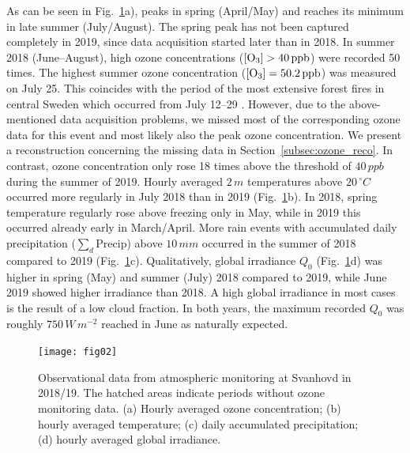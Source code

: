\documentclass[bg, manuscript]{copernicus}
\begin{document}
 As can be seen in Fig.~\ref{fig:data_svanvik_2018_2019}a), \chem{[O_3]} peaks in spring (April/May) and reaches its minimum in late summer (July/August). The spring peak has not been captured completely in 2019, since data acquisition started later than in 2018. In summer 2018 (June--August), high ozone concentrations ($\chem{[O_3]} > 40\,\unit{ppb}$) were recorded 50 times. The highest summer ozone concentration ($\chem{[O_3]} = 50.2\,\unit{ppb}$) was measured on July 25. This coincides with the period of the most extensive forest fires in central Sweden which occurred from July 12--29 \citep{SOU2019}. However, due to the above-mentioned data acquisition problems, we missed most of the corresponding ozone data for this event and most likely also the peak ozone concentration. We present a reconstruction concerning the missing data in Section~\ref{subsec:ozone_reco}. In contrast, ozone concentration only rose 18 times above the threshold of $40\,\unit{ppb}$ during the summer of 2019.
Hourly averaged $2\,\unit{m}$ temperatures above $20\,\unit{^\circ C}$ occurred more regularly in July 2018 than in 2019 (Fig.~\ref{fig:data_svanvik_2018_2019}b). In 2018, spring temperature regularly rose above freezing only in May, while in 2019 this occurred already early in March/April.
More rain events with accumulated daily precipitation ($\sum_d \mathrm{Precip}$) above $10\,\unit{mm}$ occurred in the summer of 2018 compared to 2019 (Fig.~\ref{fig:data_svanvik_2018_2019}c).
Qualitatively, global irradiance $Q_0$ (Fig.~\ref{fig:data_svanvik_2018_2019}d) was higher in spring (May) and summer (July) 2018 compared to 2019, while June 2019 showed higher irradiance than 2018. A high global irradiance in most cases is the result of a low cloud fraction. In both years, the maximum recorded $Q_0$ was roughly $750\,\unit{W\,m^{-2}}$ reached in June as naturally expected.

\begin{figure}[t]
  \texttt{[image: fig02]}
  \caption{Observational data from atmospheric monitoring at Svanhovd in 2018/19. The hatched areas indicate periods without ozone monitoring data. (a) Hourly averaged ozone concentration; (b) hourly averaged temperature; (c) daily accumulated precipitation; (d) hourly averaged global irradiance.}
  \label{fig:data_svanvik_2018_2019}
\end{figure}
\end{document}
